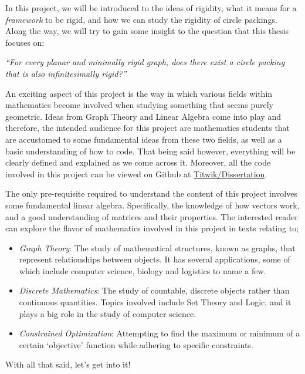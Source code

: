 \begin{flushleft}
In this project, we will be introduced to the ideas of rigidity, what it means for a \textit{framework} to be rigid, and how we can study the rigidity of circle packings. Along the way, we will try to gain some insight to the question that this thesis focuses on:

\begin{center}
    \textit{``For every planar and minimally rigid graph, does there exist a circle packing that is also infinitesimally rigid?''}
\end{center}
\end{flushleft}

\begin{flushleft}
An exciting aspect of this project is the way in which various fields within mathematics become involved when studying something that seems purely geometric. Ideas from Graph Theory and Linear Algebra come into play and therefore, the intended audience for this project are mathematics students that are accustomed to some fundamental ideas from these two fields, as well as a basic understanding of how to code. That being said however, everything will be clearly defined and explained as we come across it. Moreover, all the code involved in this project can be viewed on Github at \href{https://github.com/Titwik/Dissertation}{Titwik/Dissertation}.    
\end{flushleft}

\begin{flushleft}
The only pre-requisite required to understand the content of this project involves some fundamental linear algebra. Specifically, the knowledge of how vectors work, and a good understanding of matrices and their properties. The interested reader can explore the flavor of mathematics involved in this project in texts relating to;
\begin{itemize}
    \item \textit{Graph Theory}: The study of mathematical structures, known as graphs, that represent relationships between objects. It has several applications, some of which include computer science, biology and logistics to name a few.
    \item \textit{Discrete Mathematics}: The study of countable, discrete objects rather than continuous quantities. Topics involved include Set Theory and Logic, and it plays a big role in the study of computer science.
    \item \textit{Constrained Optimization}: Attempting to find the maximum or minimum of a certain `objective' function while adhering to specific constraints. 
\end{itemize}
\end{flushleft}

\begin{flushleft}
With all that said, let's get into it!    
\end{flushleft}

